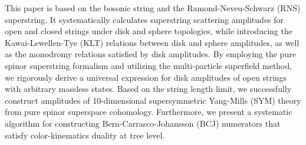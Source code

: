 
This paper is based on the bosonic string and the Ramond-Neveu-Schwarz (RNS) superstring. It systematically calculates superstring scattering amplitudes for open and closed strings under disk and sphere topologies, while introducing the Kawai-Lewellen-Tye (KLT) relations between disk and sphere amplitudes, as well as the monodromy relations satisfied by disk amplitudes. By employing the pure spinor superstring formalism and utilizing the multi-particle superfield method, we rigorously derive a universal expression for disk amplitudes of open strings with arbitrary massless states. Based on the string length limit, we successfully construct amplitudes of 10-dimensional supersymmetric Yang-Mills (SYM) theory from pure spinor superspace cohomology. Furthermore, we present a systematic algorithm for constructing Bern-Carrasco-Johansson (BCJ) numerators that satisfy color-kinematics duality at tree level.